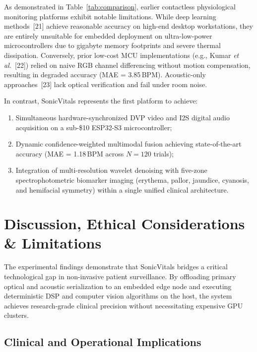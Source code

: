 \documentclass[journal]{IEEEtran}
\begin{document}
As demonstrated in Table~\ref{tab:comparison}, earlier contactless physiological monitoring platforms exhibit notable limitations. While deep learning methods~[21] achieve reasonable accuracy on high-end desktop workstations, they are entirely unsuitable for embedded deployment on ultra-low-power microcontrollers due to gigabyte memory footprints and severe thermal dissipation. Conversely, prior low-cost MCU implementations (e.g., Kumar \textit{et al.}~[22]) relied on naive RGB channel differencing without motion compensation, resulting in degraded accuracy (MAE = 3.85\,BPM). Acoustic-only approaches~[23] lack optical verification and fail under room noise.

In contrast, SonicVitals represents the first platform to achieve:
\begin{enumerate}
    \item Simultaneous hardware-synchronized DVP video and I2S digital audio acquisition on a sub-\$10 ESP32-S3 microcontroller;
    \item Dynamic confidence-weighted multimodal fusion achieving state-of-the-art accuracy (MAE = 1.18\,BPM across $N=120$ trials);
    \item Integration of multi-resolution wavelet denoising with five-zone spectrophotometric biomarker imaging (erythema, pallor, jaundice, cyanosis, and hemifacial symmetry) within a single unified clinical architecture.
\end{enumerate}

\section{Discussion, Ethical Considerations \& Limitations}

The experimental findings demonstrate that SonicVitals bridges a critical technological gap in non-invasive patient surveillance. By offloading primary optical and acoustic serialization to an embedded edge node and executing deterministic DSP and computer vision algorithms on the host, the system achieves research-grade clinical precision without necessitating expensive GPU clusters.

\subsection{Clinical and Operational Implications}
\end{document}

